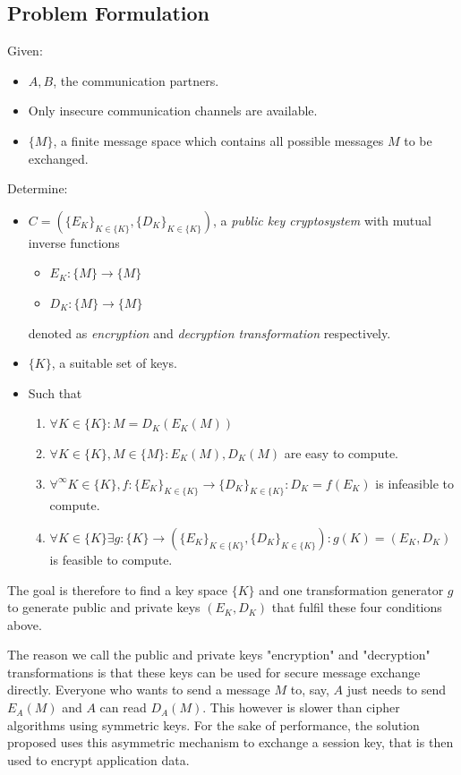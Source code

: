 \documentclass[paper=a4, fontsize=11pt]{scrartcl} %
\numberwithin{equation}{section} %
\numberwithin{figure}{section} %
\numberwithin{table}{section} %
\begin{document}
\subsection{Problem Formulation}
Given:
\begin{itemize}
	\item $A, B$, the communication partners.
	\item Only insecure communication channels are available.
	\item $\{M\}$, a finite message space which contains all possible messages $M$ to be exchanged.
\end{itemize}
Determine:
\begin{itemize}
	\item $C = (\{E_K\}_{K\in\{K\}}, \{D_K\}_{K\in\{K\}})$, a \textit{public key cryptosystem} with mutual inverse functions
	\begin{itemize}
		\item $E_K:\{M\}\rightarrow\{M\}$
		\item $D_K:\{M\}\rightarrow\{M\}$
	\end{itemize}
	denoted as \textit{encryption} and \textit{decryption transformation} respectively.
	\item $\{K\}$, a suitable set of keys.
	\item Such that
	\begin{enumerate}
	\item $\forall K\in\{K\}:M = D_K(E_K(M))$
	\item $\forall K\in\{K\},M\in\{M\}:E_K(M), D_K(M)$ are easy to compute.
	\item $\forall^\infty K\in\{K\},f:\{E_K\}_{K\in\{K\}}\rightarrow \{D_K\}_{K\in\{K\}}:D_K = f(E_K)$ is infeasible to compute.
	\item $\forall K\in\{K\}\exists g:\{K\}\rightarrow(\{E_K\}_{K\in\{K\}}, \{D_K\}_{K\in\{K\}}):g(K) = (E_K,D_K)$ is feasible to compute.
	\end{enumerate}
\end{itemize}
The goal is therefore to find a key space $\{K\}$ and one transformation generator $g$ to generate public and private keys $(E_K,D_K)$ that fulfil these four conditions above.

The reason we call the public and private keys "encryption" and "decryption" transformations is that these keys can be used for secure message exchange directly. Everyone who wants to send a message $M$ to, say, $A$ just needs to send $E_A(M)$ and $A$ can read $D_A(M)$. This however is slower than cipher algorithms using symmetric keys. For the sake of performance, the solution proposed uses this asymmetric mechanism to exchange a session key, that is then used to encrypt application data.
\end{document}
